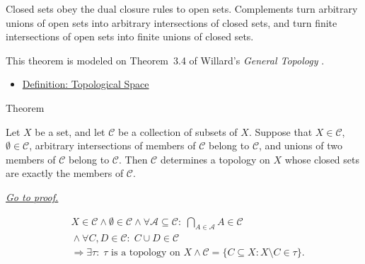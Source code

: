 \begin{remark*}[Interpretation]
Closed sets obey the dual closure rules to open sets.  Complements turn
arbitrary unions of open sets into arbitrary intersections of closed sets, and
turn finite intersections of open sets into finite unions of closed sets.
\end{remark*}

\begin{remark*}
This theorem is modeled on Theorem~3.4 of Willard's
\emph{General Topology} \cite{WillardGeneralTopology}.
\end{remark*}


\begin{dependencies}
\begin{itemize}
  \item \hyperref[def:topological-space]{Definition: Topological Space}
\end{itemize}
\end{dependencies}

\begin{theorembox}{Theorem}
\begin{theorem}
\label{thm:closed-set-characterization-topologies}
Let \(X\) be a set, and let \(\mathcal{C}\) be a collection of subsets of
\(X\).  Suppose that \(X\in\mathcal{C}\), \(\emptyset\in\mathcal{C}\),
arbitrary intersections of members of \(\mathcal{C}\) belong to
\(\mathcal{C}\), and unions of two members of \(\mathcal{C}\) belong to
\(\mathcal{C}\).  Then \(\mathcal{C}\) determines a topology on \(X\) whose
closed sets are exactly the members of \(\mathcal{C}\).

\smallskip
\noindent
\hyperref[prf:closed-set-characterization-topologies]{\textit{Go to proof.}}
\end{theorem}
\end{theorembox}

\begin{remark*}
\[
\begin{aligned}
&X\in\mathcal{C}
\land
\emptyset\in\mathcal{C}
\land
\forall\mathcal{A}\subseteq\mathcal{C}{:}\;
\bigcap_{A\in\mathcal{A}}A\in\mathcal{C}
\\
&{}\land
\forall C,D\in\mathcal{C}{:}\;
C\cup D\in\mathcal{C}
\\
&\Longrightarrow
\exists\tau{:}\;
\tau\text{ is a topology on }X
\land
\mathcal{C}
=
\{C\subseteq X:X\setminus C\in\tau\}.
\end{aligned}
\]
\end{remark*}

